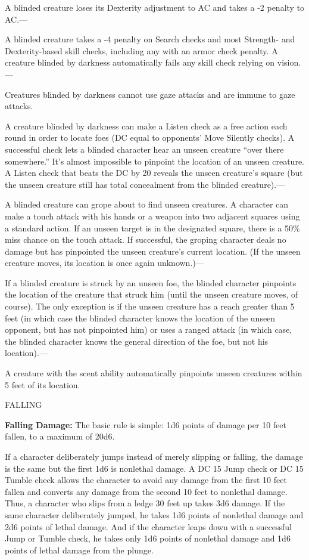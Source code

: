 \documentclass{article}
\begin{document}
A blinded creature loses its Dexterity adjustment to AC and takes a -2 penalty 
to AC.---

A blinded creature takes a -4 penalty on Search checks and most Strength- and Dexterity-based 
skill checks, including any with an armor check penalty. A creature blinded by 
darkness automatically fails any skill check relying on vision.---

Creatures blinded by darkness cannot use gaze attacks and are immune to gaze attacks.

A creature blinded by darkness can make a Listen check as a free action each round 
in order to locate foes (DC equal to opponents' Move Silently checks). A successful 
check lets a blinded character hear an unseen creature ``over there somewhere.'' 
It's almost impossible to pinpoint the location of an unseen creature. A Listen 
check that beats the DC by 20 reveals the unseen creature's square (but the unseen 
creature still has total concealment from the blinded creature).---

A blinded creature can grope about to find unseen creatures. A character can make 
a touch attack with his hands or a weapon into two adjacent squares using a standard 
action. If an unseen target is in the designated square, there is a 50\% miss chance 
on the touch attack. If successful, the groping character deals no damage but has 
pinpointed the unseen creature's current location. (If the unseen creature moves, 
its location is once again unknown.)---

If a blinded creature is struck by an unseen foe, the blinded character pinpoints 
the location of the creature that struck him (until the unseen creature moves, 
of course). The only exception is if the unseen creature has a reach greater than 
5 feet (in which case the blinded character knows the location of the unseen opponent, 
but has not pinpointed him) or uses a ranged attack (in which case, the blinded 
character knows the general direction of the foe, but not his location).---

A creature with the scent ability automatically pinpoints unseen creatures within 
5 feet of its location.

\vspace{12pt}
FALLING

\textbf{Falling Damage:} The basic rule is simple: 1d6 points of damage per 10 
feet fallen, to a maximum of 20d6.

If a character deliberately jumps instead of merely slipping or falling, the damage 
is the same but the first 1d6 is nonlethal damage. A DC 15 Jump check or DC 15 
Tumble check allows the character to avoid any damage from the first 10 feet fallen 
and converts any damage from the second 10 feet to nonlethal damage. Thus, a character 
who slips from a ledge 30 feet up takes 3d6 damage. If the same character deliberately 
jumped, he takes 1d6 points of nonlethal damage and 2d6 points of lethal damage. 
And if the character leaps down with a successful Jump or Tumble check, he takes 
only 1d6 points of nonlethal damage and 1d6 points of lethal damage from the plunge.
\end{document}
